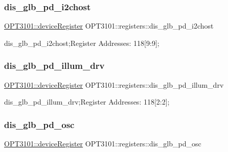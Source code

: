 \subsubsection{\texorpdfstring{dis\+\_\+glb\+\_\+pd\+\_\+i2chost}{dis\_glb\_pd\_i2chost}}
{\footnotesize\ttfamily \mbox{\hyperlink{class_o_p_t3101_1_1device_register}{O\+P\+T3101\+::device\+Register}} O\+P\+T3101\+::registers\+::dis\+\_\+glb\+\_\+pd\+\_\+i2chost}



dis\+\_\+glb\+\_\+pd\+\_\+i2chost;Register Addresses\+: 118\mbox{[}9\+:9\mbox{]}; 

\mbox{\label{class_o_p_t3101_1_1registers_a9557e8aacd96cbfd2421ed895d56abb3}} 
\subsubsection{\texorpdfstring{dis\+\_\+glb\+\_\+pd\+\_\+illum\+\_\+drv}{dis\_glb\_pd\_illum\_drv}}
{\footnotesize\ttfamily \mbox{\hyperlink{class_o_p_t3101_1_1device_register}{O\+P\+T3101\+::device\+Register}} O\+P\+T3101\+::registers\+::dis\+\_\+glb\+\_\+pd\+\_\+illum\+\_\+drv}



dis\+\_\+glb\+\_\+pd\+\_\+illum\+\_\+drv;Register Addresses\+: 118\mbox{[}2\+:2\mbox{]}; 

\mbox{\label{class_o_p_t3101_1_1registers_a2790406acd1e5fcd1f07ebb6a2066a35}} 
\subsubsection{\texorpdfstring{dis\+\_\+glb\+\_\+pd\+\_\+osc}{dis\_glb\_pd\_osc}}
{\footnotesize\ttfamily \mbox{\hyperlink{class_o_p_t3101_1_1device_register}{O\+P\+T3101\+::device\+Register}} O\+P\+T3101\+::registers\+::dis\+\_\+glb\+\_\+pd\+\_\+osc}



